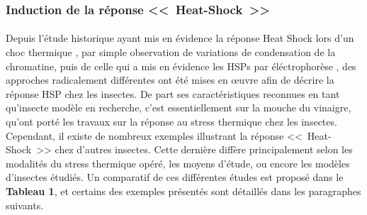 		\subsubsection{Induction de la réponse <<~Heat-Shock~>>}
		\paragraph*{}


		Depuis l'étude historique ayant mis en évidence la réponse Heat Shock lors d'un choc thermique \cite{ritossa1996}, par simple observation de variations de condensation de la chromatine, puis de celle qui a mis en évidence les HSPs par éléctrophorèse \cite{tissieres1974}, des approches radicalement différentes ont été mises en \oe{}uvre afin de décrire la réponse HSP chez les  insectes.
		De part ses caractéristiques reconnues en tant qu'insecte modèle en recherche, c'est essentiellement sur la mouche du vinaigre,  qu'ont porté les travaux sur la réponse au stress thermique chez les insectes.
		Cependant, il existe de nombreux exemples illustrant la réponse <<~Heat-Shock~>> chez d'autres insectes.
		Cette dernière diffère principalement selon les modalités du stress thermique opéré, les moyens d'étude,  ou encore les modèles d'insectes étudiés.
		Un comparatif de ces différentes études est proposé dans le \textbf{Tableau 1}, et certains des exemples présentés sont détaillés dans les paragraphes suivants.


